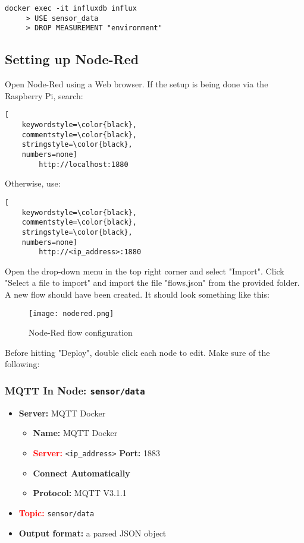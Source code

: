 \documentclass[onecolumn]{article}
\begin{document}
\begin{lstlisting}[numbers=none]
    docker exec -it influxdb influx
     > USE sensor_data
     > DROP MEASUREMENT "environment"    
\end{lstlisting}

\subsection{Setting up Node-Red}
    Open Node-Red using a Web browser. If the setup is being done via the Raspberry Pi, search: 

    \begin{lstlisting}[
    keywordstyle=\color{black},
    commentstyle=\color{black},
    stringstyle=\color{black},
    numbers=none]
        http://localhost:1880
    \end{lstlisting}

    Otherwise, use:

    \begin{lstlisting}[
    keywordstyle=\color{black},
    commentstyle=\color{black},
    stringstyle=\color{black},
    numbers=none]
        http://<ip_address>:1880
    \end{lstlisting}

    Open the drop-down menu in the top right corner and select "Import". Click "Select a file to import" and import the file "flows.json" from the provided folder. A new flow should have been created. It should look something like this:
    
\begin{figure}[H]
    \centering
    \texttt{[image: nodered.png]}
    \caption{Node-Red flow configuration}
    \label{fig:NodeRed} 
\end{figure}

    Before hitting "Deploy", double click each node to edit. Make sure of the following:


\subsubsection*{MQTT In Node: \texttt{sensor/data}}

\begin{itemize}
  \item \textbf{Server:} MQTT Docker 
  \begin{itemize}
      \item \textbf{Name:} MQTT Docker
      \item \textcolor{red}{\textbf{Server:}} \texttt{<ip\_address>}  \textbf{Port:} 1883
      \item \textbf{Connect Automatically}
      \item \textbf{Protocol:} MQTT V3.1.1
  \end{itemize}
  \item \textcolor{red}{\textbf{Topic:}} \texttt{sensor/data}
  \item \textbf{Output format:} a parsed JSON object
  
\end{itemize}
\end{document}
